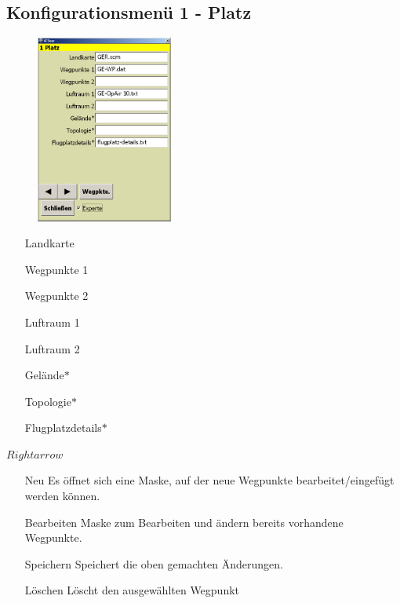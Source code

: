 \subsection{Konfigurationsmenü 1 - Platz}\label{Konfig1}
\begin{figure}
\includegraphics[width=4.5cm]{Bilder/Konfig1Platz.png}
\end{figure}

\begin{enumerate}
\item[Landkarte]
\item[Wegpunkte 1]
\item[Wegpunkte 2]
\item[Luftraum 1]
\item[Luftraum 2]
\item[Gelände$\ast$]
\item[Topologie$\ast$]
\item[Flugplatzdetails$\ast$]
\end{enumerate}
 $Rightarrow$
\begin{enumerate}
\item[Neu] Es öffnet sich eine Maske, auf der neue Wegpunkte bearbeitet/eingefügt werden können.
\item[Bearbeiten] Maske zum Bearbeiten und ändern bereits vorhandene Wegpunkte.
\item[Speichern] Speichert die oben gemachten Änderungen.
\item[Löschen] Löscht den ausgewählten Wegpunkt
\end{enumerate}

